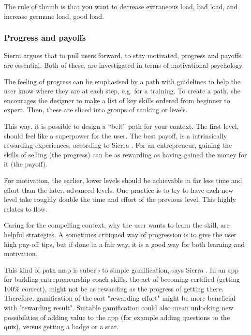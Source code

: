 The rule of thumb is that you want to decrease extraneous load, bad load, and increase germane load, good load.

\subsubsection{Progress and payoffs} \label{progress-payoffs}

Sierra argues that to pull users forward, to stay motivated, progress and payoffs are essential. Both of these, are investigated in terms of motivational psychology.

The feeling of progress can be emphasised by a path with guidelines to help the user know where they are at each step, e.g. for a training. To create a path, she encourages the designer to make a list of key skills ordered from beginner to expert. Then, these are sliced into groups of ranking or levels.

This way, it is possible to design a “belt” path for your context. The first level, should feel like a superpower for the user. The best payoff, is a intrinsically rewarding experiences, according to Sierra \citep{sierra}. For an entrepreneur, gaining the skills of selling (the progress) can be as rewarding as having gained the money for it (the payoff).

For motivation, the earlier, lower levels should be achievable in far less time and effort than the later, advanced levels. One practice is to try to have each new level take roughly double the time and effort of the previous level. This highly relates to flow.

Caring for the compelling context, why the user wants to learn the skill, are helpful strategies. A sometimes critiqued way of progression is to give the user high pay-off tips, but if done in a fair way, it is a good way for both learning and motivation.

This kind of path map is suberb to simple gamification, says Sierra \citep{sierra}. In an app for building entrepreneurship coach skills, the act of becoming certified (getting 100\% correct), might not be as rewarding as the progress of getting there. Therefore, gamification of the sort "rewarding effort" might be more beneficial with "rewarding result". Suitable gamification could also mean unlocking new possibilities of adding value to the app (for example adding questions to the quiz), versus getting a badge or a star.

